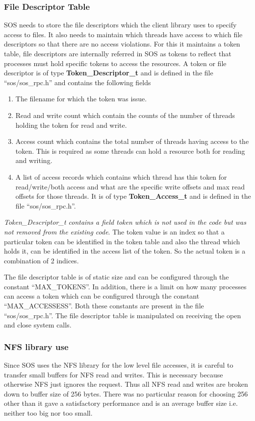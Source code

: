 \documentclass[a4paper, 11pt]{article}
\begin{document}
\subsubsection{File Descriptor Table}
SOS needs to store the file descriptors which the client library uses
to specify access to files. It also needs to maintain which threads
have access to which file descriptors so that there are no access
violations. For this it maintains a token table, file descriptors are
internally referred in SOS as tokens to reflect that processes must
hold specific tokens to access the resources. A token or file
descriptor is of type {\bf Token\_Descriptor\_t} and is defined in the
file ``sos/sos\_rpc.h'' and contains the following fields
\begin{enumerate}
\item The filename for which the token was issue.
\item Read and write count which contain the counts of the number of
  threads holding the token for read and write.
\item Access count which contains the total number of threads having
  access to the token. This is required as some threads can hold a
  resource both for reading and writing.
\item A list of access records which contains which thread has this
  token for read/write/both access and what are the specific write
  offsets and max read offsets for those threads. It is of type {\bf
    Token\_Access\_t} and is defined in the file ``sos/sos\_rpc.h''.
\end{enumerate}

\textit{Token\_Descriptor\_t contains a field token which is not used in
the code but was not removed from the existing code}. The token value
is an index so that a particular token can be identified in the token
table and also the thread which holds it, can be identified in the access
list of the token. So the actual token is a combination of 2 indices.

The file descriptor table is of static size and can be configured
through the constant ``MAX\_TOKENS''. In addition, there is a limit on
how many processes can access a token which can be configured through
the constant ``MAX\_ACCESSESS''. Both these constants are present in
the file ``sos/sos\_rpc.h''. The file descriptor table is manipulated
on receiving the open and close system calls.

\subsubsection{NFS library use}
Since SOS uses the NFS library for the low level file accesses, it is
careful to transfer small buffers for NFS read and writes. This is
necessary because otherwise NFS just ignores the request. Thus all NFS
read and writes are broken down to buffer size of 256 bytes. There was
no particular reason for choosing 256 other than it gave a
satisfactory performance and is an average buffer size i.e. neither
too big nor too small.
\end{document}
